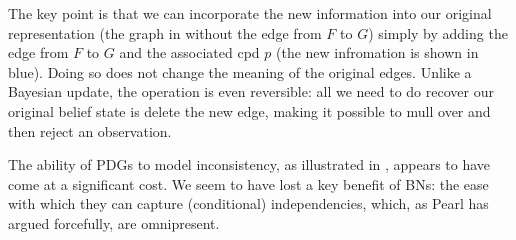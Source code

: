 \documentclass[letterpaper]{article} %
\theoremstyle{plain}
\theoremstyle{definition}
\theoremstyle{remark}
\newcommand\mat[1]{\mathbf{#1}}
\begin{document}
\begin{example}
The key point is that we can incorporate the new information into our original
representation (the graph in  without the edge from
$F$ to $G$) simply  by adding the edge from $F$ to $G$ and the associated cpd
$p$ (the new infromation is shown in blue).
Doing so does not change the meaning of the original edges.   
Unlike a Bayesian update, the operation is even reversible: all we need
to do recover our original belief state is delete the new edge, 
making it possible to mull over and then reject an observation.
%
\end{example}


The ability of PDGs to model inconsistency, as illustrated in
, appears to have come at a significant cost. We seem
to have lost a key benefit of BNs: the ease with which they can
capture
(conditional) independencies, which, as Pearl \cite{pearl1989conditional} has
argued forcefully, are omnipresent.


	
\end{document}
